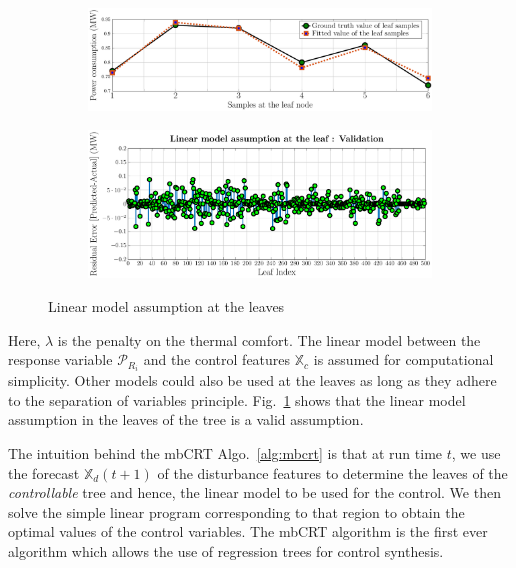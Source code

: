 \begin{figure}
\centering
  \begin{subfigure}
    \centering
  \includegraphics[width=0.7\columnwidth]{figs/leaf200}
  \end{subfigure}  
  \begin{subfigure}
    \centering
  \includegraphics[width=0.7\columnwidth]{figs/goodleaf}
  \end{subfigure}
  \caption{Linear model assumption at the leaves}
  \label{fig:leaf}
\end{figure}
Here, $\lambda$ is the penalty on the thermal comfort. The linear model between the response variable $\mathcal{P}_{R_i}$ and the control features $\mathbb{X}_c$ is assumed for computational simplicity. Other models could also be used at the leaves as long as they adhere to the separation of variables principle. Fig.~\ref{fig:leaf} shows that the linear model assumption in the leaves of the tree is a valid assumption.

The intuition behind the mbCRT Algo.~\ref{alg:mbcrt} is that at run time $t$, we use the forecast $\mathbb{X}_d(t+1)$ of the disturbance features to determine the leaves of the \textit{controllable} tree and hence, the linear model to be used for the control.
We then solve the simple linear program corresponding to that region to obtain the optimal values of the control variables. 
The mbCRT algorithm is the first ever algorithm which allows the use of regression trees for control synthesis. 
